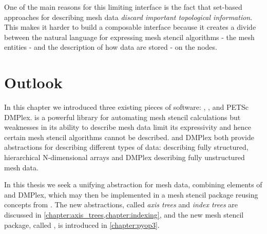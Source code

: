 \documentclass[thesis]{subfiles}
\begin{document}
One of the main reasons for this limiting interface is the fact that set-based approaches for describing mesh data \emph{discard important topological information}.
This makes it harder to build a composable interface because it creates a divide between the natural language for expressing mesh stencil algorithms - the mesh entities - and the description of how data are stored - on the nodes.

\section{Outlook}

In this chapter we introduced three existing pieces of software: , \numpy{}, and PETSc DMPlex.
 is a powerful library for automating mesh stencil calculations but weaknesses in its ability to describe mesh data limit its expressivity and hence certain mesh stencil algorithms cannot be described.
\numpy{} and DMPlex both provide abstractions for describing different types of data: \numpy{} describing fully structured, hierarchical N-dimensional arrays and DMPlex describing fully unstructured mesh data.

In this thesis we seek a unifying abstraction for mesh data, combining elements of \numpy{} and DMPlex, which may then be implemented in a mesh stencil package reusing concepts from .
The new abstractions, called \emph{axis trees} and \emph{index trees} are discussed in \cref{chapter:axis_trees,chapter:indexing}, and the new mesh stencil package, called , is introduced in \cref{chapter:pyop3}.
\end{document}
